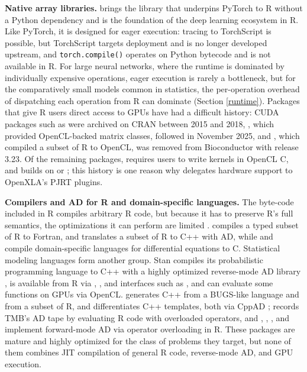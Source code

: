 \textbf{Native array libraries.}
 \citep{ref-rtorch} brings the  library that underpins PyTorch to R without a Python dependency and is the foundation of the deep learning ecosystem in R.
Like PyTorch, it is designed for eager execution: tracing to TorchScript is possible, but TorchScript targets deployment and is no longer developed upstream, and \texttt{torch.compile()} operates on Python bytecode and is not available in R.
For large neural networks, where the runtime is dominated by individually expensive operations, eager execution is rarely a bottleneck, but for the comparatively small models common in statistics, the per-operation overhead of dispatching each operation from R can dominate (Section \ref{runtime}).
Packages that give R users direct access to GPUs have had a difficult history: CUDA packages such as  \citep{ref-gputools} were archived on CRAN between 2015 and 2018,  \citep{ref-gpur}, which provided OpenCL-backed matrix classes, followed in November 2025, and  \citep{ref-gpumagic}, which compiled a subset of R to OpenCL, was removed from Bioconductor with release 3.23.
Of the remaining packages,  \citep{ref-opencl-r} requires users to write kernels in OpenCL C, and  \citep{ref-gpumatrix} builds on  or ; this history is one reason why  delegates hardware support to OpenXLA's PJRT plugins.

\textbf{Compilers and AD for R and domain-specific languages.}
The byte-code  included in R \citep{ref-r} compiles arbitrary R code, but because it has to preserve R's full semantics, the optimizations it can perform are limited \citep{ref-evaluating-r}.
 \citep{ref-quickr} compiles a typed subset of R to Fortran, and  \citep{ref-ast2ast} translates a subset of R to C++ with AD, while  \citep{ref-odin} and  \citep{ref-rxode2} compile domain-specific languages for differential equations to C.
Statistical modeling languages form another group.
Stan \citep{ref-stan} compiles its probabilistic programming language to C++ with a highly optimized reverse-mode AD library \citep{ref-stanmath}, is available from R via ,  \citep{ref-cmdstanr}, and interfaces such as  \citep{ref-brms}, and can evaluate some functions on GPUs via OpenCL.
 \citep{ref-nimble} generates C++ from a BUGS-like language and from a subset of R, and  \citep{ref-tmb} differentiates C++ templates, both via CppAD \citep{ref-cppad};  \citep{ref-rtmb} records TMB's AD tape by evaluating R code with overloaded operators, and  \citep{ref-dual},  \citep{ref-madness},  \citep{ref-nabla}, and  \citep{ref-salad} implement forward-mode AD via operator overloading in R.
These packages are mature and highly optimized for the class of problems they target, but none of them combines JIT compilation of general R code, reverse-mode AD, and GPU execution.

